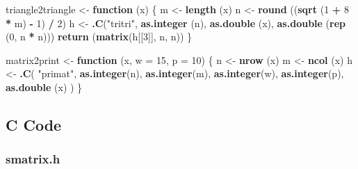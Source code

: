\documentclass[12pt,]{article}
\newenvironment{Shaded}{\begin{snugshade}}{\end{snugshade}}
\newcommand{\ControlFlowTok}[1]{\textcolor[rgb]{0.13,0.29,0.53}{\textbf{#1}}}
\newcommand{\DataTypeTok}[1]{\textcolor[rgb]{0.13,0.29,0.53}{#1}}
\newcommand{\DecValTok}[1]{\textcolor[rgb]{0.00,0.00,0.81}{#1}}
\newcommand{\KeywordTok}[1]{\textcolor[rgb]{0.13,0.29,0.53}{\textbf{#1}}}
\newcommand{\NormalTok}[1]{#1}
\newcommand{\OperatorTok}[1]{\textcolor[rgb]{0.81,0.36,0.00}{\textbf{#1}}}
\newcommand{\StringTok}[1]{\textcolor[rgb]{0.31,0.60,0.02}{#1}}
\begin{document}
\begin{Shaded}
\begin{Highlighting}[]
\NormalTok{triangle2triangle <-}\StringTok{ }\ControlFlowTok{function}\NormalTok{ (x) \{}
\NormalTok{  m <-}\StringTok{ }\KeywordTok{length}\NormalTok{ (x)}
\NormalTok{  n <-}\StringTok{ }\KeywordTok{round}\NormalTok{ ((}\KeywordTok{sqrt}\NormalTok{ (}\DecValTok{1} \OperatorTok{+}\StringTok{ }\DecValTok{8} \OperatorTok{*}\StringTok{ }\NormalTok{m) }\OperatorTok{-}\StringTok{ }\DecValTok{1}\NormalTok{) }\OperatorTok{/}\StringTok{ }\DecValTok{2}\NormalTok{)}
\NormalTok{  h <-}
\StringTok{    }\KeywordTok{.C}\NormalTok{(}\StringTok{"tritri"}\NormalTok{, }\KeywordTok{as.integer}\NormalTok{ (n), }\KeywordTok{as.double}\NormalTok{ (x), }\KeywordTok{as.double}\NormalTok{ (}\KeywordTok{rep}\NormalTok{ (}\DecValTok{0}\NormalTok{, n }\OperatorTok{*}\StringTok{ }\NormalTok{n)))}
  \KeywordTok{return}\NormalTok{ (}\KeywordTok{matrix}\NormalTok{(h[[}\DecValTok{3}\NormalTok{]], n, n))}
\NormalTok{\}}

\NormalTok{matrix2print <-}\StringTok{ }\ControlFlowTok{function}\NormalTok{ (x, }\DataTypeTok{w =} \DecValTok{15}\NormalTok{, }\DataTypeTok{p =} \DecValTok{10}\NormalTok{) \{}
\NormalTok{  n <-}\StringTok{ }\KeywordTok{nrow}\NormalTok{ (x)}
\NormalTok{  m <-}\StringTok{ }\KeywordTok{ncol}\NormalTok{ (x)}
\NormalTok{  h <-}
\StringTok{    }\KeywordTok{.C}\NormalTok{(}
      \StringTok{"primat"}\NormalTok{,}
      \KeywordTok{as.integer}\NormalTok{(n),}
      \KeywordTok{as.integer}\NormalTok{(m),}
      \KeywordTok{as.integer}\NormalTok{(w),}
      \KeywordTok{as.integer}\NormalTok{(p),}
      \KeywordTok{as.double}\NormalTok{ (x)}
\NormalTok{    )}
\NormalTok{\}}
\end{Highlighting}
\end{Shaded}

\hypertarget{c-code}{%
\subsection{C Code}\label{c-code}}

\hypertarget{smatrix.h}{%
\subsubsection{smatrix.h}\label{smatrix.h}}
\end{document}
